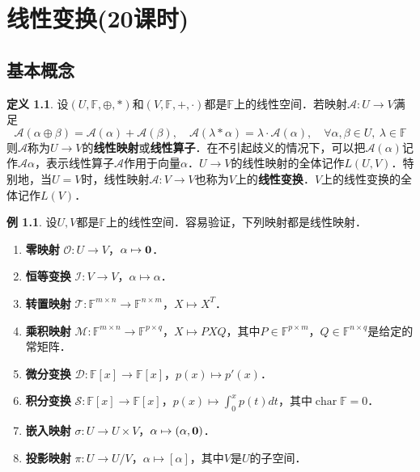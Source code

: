 \documentclass[a4paper,fontset=windows]{ctexbook}
\theoremstyle{definition}
\newtheorem{definition}{定义}[chapter]
\newtheorem{example}{例}[chapter]
\DeclareMathOperator{\Char}{char}
\begin{document}
\chapter{线性变换(20课时)}%

\section{基本概念}

\begin{definition}
设$(U,\mathbb{F},\oplus,*)$和$(V,\mathbb{F},+,\cdot)$都是$\mathbb{F}$上的线性空间．若映射$\mathcal{A}:U\to V$满足
$$\mathcal{A}(\alpha\oplus\beta)=\mathcal{A}(\alpha)+\mathcal{A}(\beta),\quad\mathcal{A}(\lambda*\alpha)=\lambda\cdot\mathcal{A}(\alpha),\quad\forall\alpha,\beta\in U,~\lambda\in\mathbb{F}$$
则$\mathcal{A}$称为$U\to V$的{\bf 线性映射}或{\bf 线性算子}．在不引起歧义的情况下，可以把$\mathcal{A}(\alpha)$记作$\mathcal{A}\alpha$，表示线性算子$\mathcal{A}$作用于向量$\alpha$．$U\to V$的线性映射的全体记作$L(U,V)$．特别地，当$U=V$时，线性映射$\mathcal{A}:V\to V$也称为$V$上的{\bf 线性变换}．$V$上的线性变换的全体记作$L(V)$．
\end{definition}

\begin{example}\label{ex9.1}
设$U,V$都是$\mathbb{F}$上的线性空间．容易验证，下列映射都是线性映射．
\begin{enumerate}
\item {\bf 零映射} $\mathcal{O}:U\to V$，$\alpha\mapsto{\bf 0}$．

\item {\bf 恒等变换} $\mathcal{I}:V\to V$，$\alpha\mapsto\alpha$．

\item {\bf 转置映射} $\mathcal{T}:\mathbb{F}^{m\times n}\to\mathbb{F}^{n\times m}$，$X\mapsto X^T$．

\item {\bf 乘积映射} $\mathcal{M}:\mathbb{F}^{m\times n}\to\mathbb{F}^{p\times q}$，$X\mapsto PXQ$，其中$P\in\mathbb{F}^{p\times m}$，$Q\in\mathbb{F}^{n\times q}$是给定的常矩阵．

\item {\bf 微分变换} $\mathcal{D}:\mathbb{F}[x]\to\mathbb{F}[x]$，$p(x)\mapsto p'(x)$．

\item {\bf 积分变换} $\mathcal{S}:\mathbb{F}[x]\to\mathbb{F}[x]$，$p(x)\mapsto \int_0^xp(t)dt$，其中$\Char\mathbb{F}=0$．

\item {\bf 嵌入映射} $\mathcal{\sigma}:U\to U\times V$，$\alpha\mapsto(\alpha,{\bf 0})$．

\item {\bf 投影映射} $\mathcal{\pi}:U\to U/V$，$\alpha\mapsto[\alpha]$，其中$V$是$U$的子空间．
\end{enumerate}
\end{example}
\end{document}
